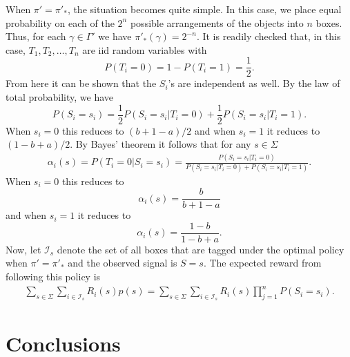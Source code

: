 \documentclass[a4paper,11pt]{article}
\begin{document}
When $\pi'=\pi'_*$, the situation becomes quite simple. In this case, we place equal probability on each of the $2^n$ possible arrangements of the objects into $n$ boxes. Thus, for each $\gamma\in\Gamma'$ we have $\pi'_*(\gamma)=2^{-n}$. It is readily checked that, in this case, $T_1,T_2,\dots,T_n$ are iid random variables with
$$
P(T_i=0) = 1-P(T_i=1) = \frac{1}{2}.
$$
From here it can be shown that the $S_i$'s are independent as well. By the law of total probability, we have
$$
P(S_i=s_i) = \frac{1}{2}P(S_i=s_i|T_i=0)+\frac{1}{2}P(S_i=s_i|T_i=1).
$$
When $s_i=0$ this reduces to $(b+1-a)/2$ and when $s_i=1$ it reduces to $(1-b+a)/2$. By Bayes' theorem it follows that for any $s\in\Sigma$
\begin{eqnarray*}
\alpha_i(s) = P(T_i=0|S_i=s_i) = \frac{P(S_i=s_i|T_i=0)}{P(S_i=s_i|T_i=0)+P(S_i=s_i|T_i=1)}.
\end{eqnarray*}
When $s_i=0$ this reduces to
$$
\alpha_i(s) =\frac{b}{b+1-a}
$$
and when $s_i=1$ it reduces to
$$
\alpha_i(s) =\frac{1-b}{1-b+a}.
$$
Now, let $\mathcal I_s$ denote the set of all boxes that are tagged under the optimal policy when $\pi'=\pi'_*$ and the observed signal is $S=s$. The expected reward from following this policy is
\begin{eqnarray*}
\sum_{s\in\Sigma} \sum_{i\in\mathcal I_s} R_i(s) p(s) = \sum_{s\in\Sigma} \sum_{i\in\mathcal I_s} R_i(s) \prod_{j=1}^n P(S_i=s_i).
\end{eqnarray*}

\section{Conclusions}\label{sec:con}
\end{document}
